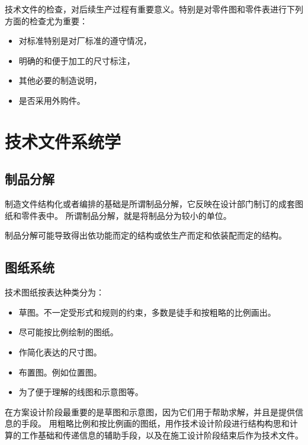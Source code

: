 \documentclass[letterpaper,10pt,english]{sphinxmanual}
\begin{document}
技术文件的检查，对后续生产过程有重要意义。特别是对零件图和零件表进行下列方面的检查尤为重要：
\begin{itemize}
\item {} 
对标准特别是对厂标准的遵守情况，

\item {} 
明确的和便于加工的尺寸标注，

\item {} 
其他必要的制造说明，

\item {} 
是否采用外购件。

\end{itemize}


\section{技术文件系统学}
\label{unit8:id3}

\subsection{制品分解}
\label{unit8:id4}
制造文件结构化或者编排的基础是所谓制品分解，它反映在设计部门制订的成套图纸和零件表中。
所谓制品分解，就是将制品分为较小的单位。

制品分解可能导致得出依功能而定的结构或依生产而定和依装配而定的结构。


\subsection{图纸系统}
\label{unit8:id5}
技术图纸按表达种类分为：
\begin{itemize}
\item {} 
草图。不一定受形式和规则的约束，多数是徒手和按粗略的比例画出。

\item {} 
尽可能按比例绘制的图纸。

\item {} 
作简化表达的尺寸图。

\item {} 
布置图。例如位置图。

\item {} 
为了便于理解的线图和示意图等。

\end{itemize}

在方案设计阶段最重要的是草图和示意图，因为它们用于帮助求解，并且是提供信息的手段。
用粗略比例和按比例画的图纸，用作技术设计阶段进行结构构思和计算的工作基础和传递信息的辅助手段，以及在施工设计阶段结束后作为技术文件。
\end{document}
